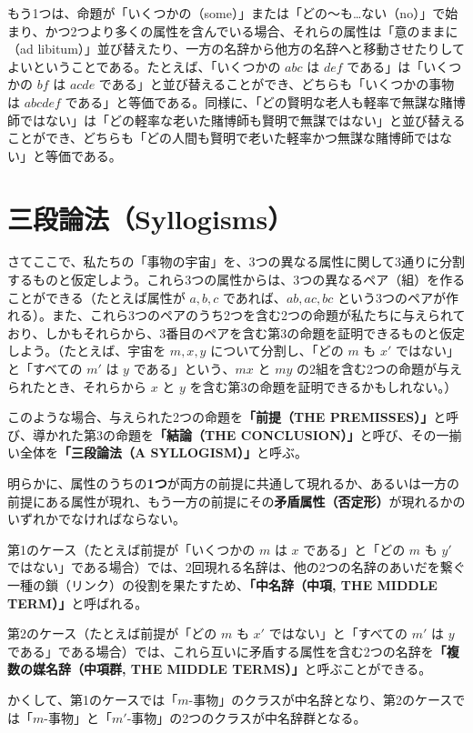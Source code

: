 \documentclass[a4paper,11pt,openany]{ltjsbook}
\begin{document}
もう1つは、命題が「いくつかの（some）」または「どの〜も…ない（no）」で始まり、かつ2つより多くの属性を含んでいる場合、それらの属性は「意のままに（ad libitum）」並び替えたり、一方の名辞から他方の名辞へと移動させたりしてよいということである。たとえば、「いくつかの $a b c$ は $d e f$ である」は「いくつかの $b f$ は $a c d e$ である」と並び替えることができ、どちらも「いくつかの事物は $a b c d e f$ である」と等価である。同様に、「どの賢明な老人も軽率で無謀な賭博師ではない」は「どの軽率な老いた賭博師も賢明で無謀ではない」と並び替えることができ、どちらも「どの人間も賢明で老いた軽率かつ無謀な賭博師ではない」と等価である。

\section{三段論法（Syllogisms）}

さてここで、私たちの「事物の宇宙」を、3つの異なる属性に関して3通りに分割するものと仮定しよう。これら3つの属性からは、3つの異なるペア（組）を作ることができる（たとえば属性が $a, b, c$ であれば、$ab, ac, bc$ という3つのペアが作れる）。また、これら3つのペアのうち2つを含む2つの命題が私たちに与えられており、しかもそれらから、3番目のペアを含む第3の命題を証明できるものと仮定しよう。（たとえば、宇宙を $m, x, y$ について分割し、「どの $m$ も $x'$ ではない」と「すべての $m'$ は $y$ である」という、$mx$ と $my$ の2組を含む2つの命題が与えられたとき、それらから $x$ と $y$ を含む第3の命題を証明できるかもしれない。）

このような場合、与えられた2つの命題を\textbf{「前提（THE PREMISSES）」}と呼び、導かれた第3の命題を\textbf{「結論（THE CONCLUSION）」}と呼び、その一揃い全体を\textbf{「三段論法（A SYLLOGISM）」}と呼ぶ。

明らかに、属性のうちの\textbf{1つ}が両方の前提に共通して現れるか、あるいは一方の前提にある属性が現れ、もう一方の前提にその\textbf{矛盾属性（否定形）}が現れるかのいずれかでなければならない。

第1のケース（たとえば前提が「いくつかの $m$ は $x$ である」と「どの $m$ も $y'$ ではない」である場合）では、2回現れる名辞は、他の2つの名辞のあいだを繋ぐ一種の鎖（リンク）の役割を果たすため、\textbf{「中名辞（中項, THE MIDDLE TERM）」}と呼ばれる。

第2のケース（たとえば前提が「どの $m$ も $x'$ ではない」と「すべての $m'$ は $y$ である」である場合）では、これら互いに矛盾する属性を含む2つの名辞を\textbf{「複数の媒名辞（中項群, THE MIDDLE TERMS）」}と呼ぶことができる。

かくして、第1のケースでは「$m$-事物」のクラスが中名辞となり、第2のケースでは「$m$-事物」と「$m'$-事物」の2つのクラスが中名辞群となる。
\end{document}
